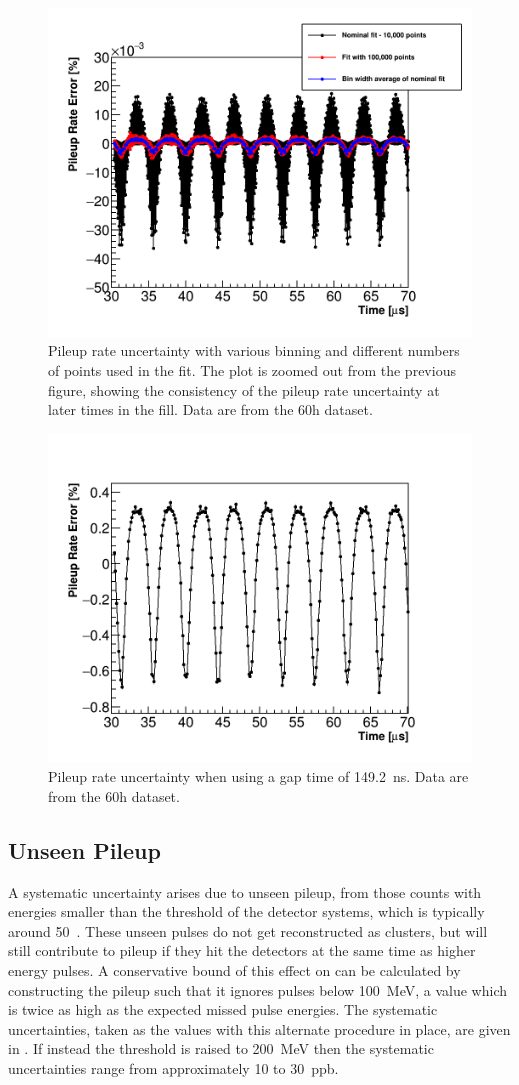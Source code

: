 \begin{figure}
    \centering
    \includegraphics[width=.6\textwidth]{PileupRateError_ZoomedOut}
    \caption[]{Pileup rate uncertainty with various binning and different numbers of points used in the fit. The plot is zoomed out from the previous figure, showing the consistency of the pileup rate uncertainty at later times in the fill. Data are from the 60h dataset.}
    \label{fig:pileupRateErrorZoomed}
\end{figure}

\clearpage
\begin{figure}
    \centering
    \includegraphics[width=.6\textwidth]{PileupRateError_149p2SGT}
    \caption[]{Pileup rate uncertainty when using a gap time of \SI{149.2}{\ns}. Data are from the 60h dataset.}
    \label{fig:pileupRateErrorLarger}
\end{figure}




\subsection{Unseen Pileup}

A systematic uncertainty arises due to unseen pileup, from those counts with energies smaller than the threshold of the detector systems, which is typically around 50~\MeV. These unseen pulses do not get reconstructed as clusters, but will still contribute to pileup if they hit the detectors at the same time as higher energy pulses. A conservative bound of this effect on \R can be calculated by constructing the pileup such that it ignores pulses below \SI{100}{\MeV}, a value which is twice as high as the expected missed pulse energies. The systematic uncertainties, taken as the \DR values with this alternate procedure in place, are given in . If instead the threshold is raised to \SI{200}{\MeV} then the systematic uncertainties range from approximately 10 to 30~ppb.


